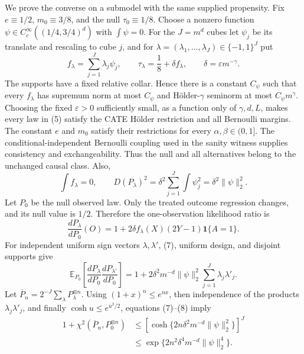 We prove the converse on a submodel with the same supplied propensity. Fix \(e\equiv1/2\), \(m_0\equiv3/8\), and the null \(\tau_0\equiv1/8\). Choose a nonzero function \(\psi\in C_c^\infty((1/4,3/4)^d)\) with \(\int\psi=0\). For the \(J=m^d\) cubes let \(\psi_j\) be its translate and rescaling to cube \(j\), and for \(\lambda=(\lambda_1,\ldots,\lambda_J)\in\{-1,1\}^J\) put
\[
 f_\lambda=\sum_{j=1}^J\lambda_j\psi_j,
 \qquad
 \tau_\lambda=\frac18+\delta f_\lambda,
 \qquad
 \delta=\varepsilon m^{-\gamma}.                                    \tag{5}
\]
The supports have a fixed relative collar. Hence there is a constant \(C_\psi\) such that every \(f_\lambda\) has supremum norm at most \(C_\psi\) and Hölder-\(\gamma\) seminorm at most \(C_\psi m^\gamma\). Choosing the fixed \(\varepsilon>0\) sufficiently small, as a function only of \(\gamma,d,L\), makes every law in (5) satisfy the CATE Hölder restriction and all Bernoulli margins. The constant \(e\) and \(m_0\) satisfy their restrictions for every \(\alpha,\beta\in(0,1]\). The conditional-independent Bernoulli coupling used in the sanity witness supplies consistency and exchangeability. Thus the null and all alternatives belong to the unchanged causal class. Also,
\[
 \int f_\lambda=0,
 \qquad
 D(P_\lambda)^2
 =\delta^2\sum_{j=1}^J\int\psi_j^2
 =\delta^2\lVert\psi\rVert_2^2.                                    \tag{6}
\]
Let \(P_0\) be the null observed law. Only the treated outcome regression changes, and its null value is \(1/2\). Therefore the one-observation likelihood ratio is
\[
 \frac{dP_\lambda}{dP_0}(O)
 =1+2\delta f_\lambda(X)(2Y-1)\mathbf1\{A=1\}.                       \tag{7}
\]
For independent uniform sign vectors \(\lambda,\lambda'\), (7), uniform design, and disjoint supports give
\[
 \mathbb E_{P_0}\!\left[\frac{dP_\lambda}{dP_0}
                         \frac{dP_{\lambda'}}{dP_0}\right]
 =1+2\delta^2m^{-d}\lVert\psi\rVert_2^2
       \sum_{j=1}^J\lambda_j\lambda'_j.                              \tag{8}
\]
Let \(\overline P_n=2^{-J}\sum_\lambda P_\lambda^{\otimes n}\). Using \((1+x)^n\le e^{nx}\), then independence of the products \(\lambda_j\lambda'_j\), and finally \(\cosh u\le e^{u^2/2}\), equations (7)--(8) imply
\[
 \begin{aligned}
 1+\chi^2(\overline P_n,P_0^{\otimes n})
 &\le\left[\cosh\{2n\delta^2m^{-d}\lVert\psi\rVert_2^2\}\right]^J\\
 &\le\exp\{2n^2\delta^4m^{-d}\lVert\psi\rVert_2^4\}.
 \end{aligned}                                                       \tag{9}
\]
